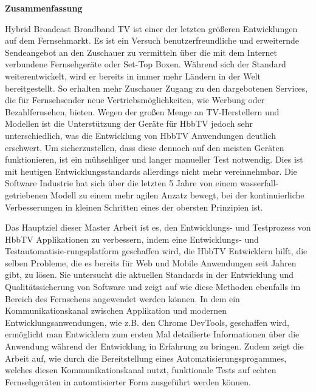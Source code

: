 
\thispagestyle{empty}
\vspace*{0.2cm}

\begin{center}
    \textbf{Zusammenfassung}
\end{center}

\vspace*{0.2cm}

\noindent

Hybrid Broadcast Broadband TV ist einer der letzten größeren Entwicklungen auf dem Fernsehmarkt. Es ist ein Versuch benutzerfreundliche und erweiternde Sendeangebot an den Zuschauer zu vermitteln über die mit dem Internet verbundene Fernsehgeräte oder Set-Top Boxen. Während sich der Standard weiterentwickelt, wird er bereits in immer mehr Ländern in der Welt bereitgestellt. So erhalten mehr Zuschauer Zugang zu den dargebotenen Services, die für Fernsehsender neue Vertriebsmöglichkeiten, wie Werbung oder Bezahlfernsehen, bieten. Wegen der großen Menge an TV-Herstellern und Modellen ist die Unterstützung der Geräte für HbbTV jedoch sehr unterschiedlich, was die Entwicklung von HbbTV Anwendungen deutlich erschwert. Um sicherzustellen, dass diese dennoch auf den meisten Geräten funktionieren, ist ein mühsehliger und langer manueller Test notwendig. Dies ist mit heutigen Entwicklungsstandards allerdings nicht mehr vereinnehmbar. Die Software Industrie hat sich über die letzten 5 Jahre von einem wasserfall-getriebenen Modell zu einem mehr agilen Anzatz bewegt, bei der kontinuierliche Verbesserungen in kleinen Schritten eines der obersten Prinzipien ist.

Das Hauptziel dieser Master Arbeit ist es, den Entwicklungs- und Testprozess von HbbTV Applikationen zu verbessern, indem eine Entwicklungs- und Testautomatisie-rungsplatform geschaffen wird, die HbbTV Entwicklern hilft, die selben Probleme, die es bereits für Web und Mobile Anwendungen seit Jahren gibt, zu lösen. Sie untersucht die aktuellen Standards in der Entwicklung und Qualitätssicherung von Software und zeigt auf wie diese Methoden ebenfalls im Bereich des Fernsehens angewendet werden können. In dem ein Kommunikationskanal zwischen Applikation und modernen Entwicklungsanwendungen, wie z.B. den Chrome DevTools, geschaffen wird, ermöglicht man Entwicklern zum ersten Mal detailierte Informationen über die Anwendung während der Entwicklung in Erfahrung zu bringen. Zudem zeigt die Arbeit auf, wie durch die Bereitstellung eines Automatisierungsprogammes, welches diesen Kommunikationskanal nutzt, funktionale Tests auf echten Fernsehgeräten in automtisierter Form ausgeführt werden können.

